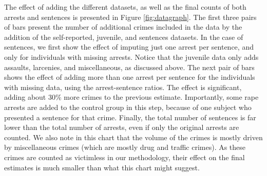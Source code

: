 \noindent The effect of adding the different datasets, as well as the final counts of both arrests and sentences is presented in Figure \ref{fig:datagraph}. The first three pairs of bars present the number of additional crimes included in the data by the addition of the self-reported, juvenile, and sentences datasets. In the case of sentences, we first show the effect of imputing just one arrest per sentence, and only for individuals with missing arrests. Notice that the juvenile data only adds assaults, larcenies, and miscellaneous, as discussed above. The next pair of bars shows the effect of adding more than one arrest per sentence for the individuals with missing data, using the arrest-sentence ratios. The effect is significant, adding about 30\% more crimes to the previous estimate. Importantly, some rape arrests are added to the control group in this step, because of one subject who presented a sentence for that crime. Finally, the total number of sentences is far lower than the total number of arrests, even if only the original arrests are counted. We also note in this chart that the volume of the crimes is mostly driven by miscellaneous crimes (which are mostly drug and traffic crimes). As these crimes are counted as victimless in our methodology, their effect on the final estimates is much smaller than what this chart might suggest. \\

